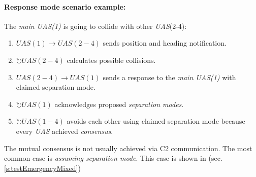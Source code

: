 \paragraph{Response mode scenario example:} The \emph{main UAS(1)} is going to collide with other \emph{UAS}(2-4):
\begin{enumerate}
    \item $UAS(1) \to UAS(2-4)$ sends position and heading notification.
    \item $\circlearrowright UAS(2-4)$ calculates possible collisions.
    \item $UAS(2-4) \to UAS(1)$ sends a response to the \emph{main UAS(1)} with claimed separation mode. 
    \item $\circlearrowright UAS(1)$ acknowledges proposed \emph{separation modes}.
    \item $\circlearrowright UAS(1-4)$ avoids each other using claimed separation mode because every \emph{UAS} achieved \emph{consensus}.
\end{enumerate}

\begin{note}
	The mutual consensus is not usually achieved via C2 communication. The most common case is \emph{assuming separation mode}. This case is shown in (sec. \ref{s:testEmergencyMixed})
\end{note}